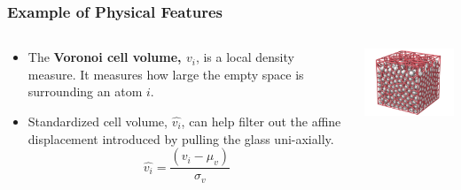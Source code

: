 \frame
{
\frametitle{Example of Physical Features}


\begin{minipage}[0.2\textheight]{\textwidth}
\begin{columns}
    \begin{column}{0.6\textwidth}
    \begin{itemize}
    \item The \textbf{Voronoi cell volume, $v_i$}, is a local density measure. It measures how large the empty space is surrounding an atom $i$.
    \item Standardized cell volume, $\hat{v_i}$, can help filter out the affine displacement introduced by pulling the glass uni-axially.
    \newline
    $$\hat{v_i} = \frac{(v_i - \mu_v)}{\sigma_v}$$
    \newline
    \end{itemize}
    \end{column}
    
    \begin{column}{0.5\textwidth}
    \includegraphics[width=5.5cm]{images/voronoi.png}
    \end{column}
\end{columns}
\end{minipage}
}

